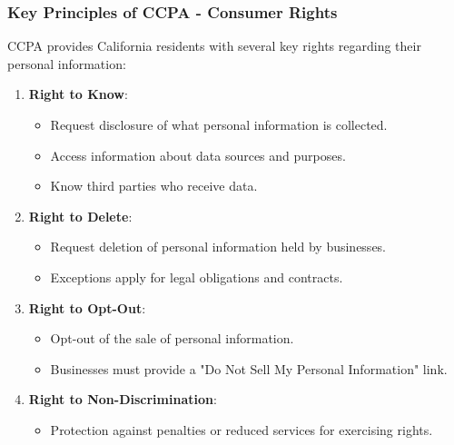 \documentclass{beamer}
\begin{document}
\begin{frame}[fragile]
    \frametitle{Key Principles of CCPA - Consumer Rights}
    CCPA provides California residents with several key rights regarding their personal information:
    
    \begin{enumerate}
        \item \textbf{Right to Know}:
        \begin{itemize}
            \item Request disclosure of what personal information is collected.
            \item Access information about data sources and purposes.
            \item Know third parties who receive data.
        \end{itemize}
        
        \item \textbf{Right to Delete}:
        \begin{itemize}
            \item Request deletion of personal information held by businesses.
            \item Exceptions apply for legal obligations and contracts.
        \end{itemize}
        
        \item \textbf{Right to Opt-Out}:
        \begin{itemize}
            \item Opt-out of the sale of personal information.
            \item Businesses must provide a "Do Not Sell My Personal Information" link.
        \end{itemize}
        
        \item \textbf{Right to Non-Discrimination}:
        \begin{itemize}
            \item Protection against penalties or reduced services for exercising rights.
        \end{itemize}
    \end{enumerate}
\end{frame}
\end{document}
